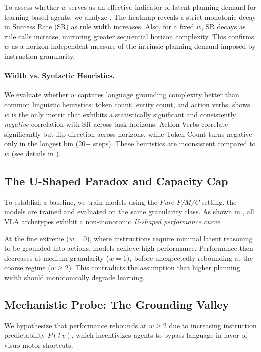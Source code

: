\documentclass[11pt]{article}
\begin{document}
To assess whether $w$ serves as an effective indicator of latent planning demand for learning-based agents, we analyze . The heatmap reveals a strict monotonic decay in Success Rate (SR) as rule width increases. Also, for a fixed $w$, SR decays as rule calls increase, mirroring greater sequential horizon complexity. This confirms $w$ as a horizon-independent measure of the intrinsic planning demand imposed by instruction granularity.

\paragraph{Width vs. Syntactic Heuristics.} 
We evaluate whether $w$ captures language grounding complexity better than common linguistic heuristics: token count, entity count, and action verbs.  shows $w$ is the only metric that exhibits a statistically significant and consistently \emph{negative} correlation with SR across task horizons. Action Verbs correlate significantly but flip direction across horizons, while Token Count turns negative only in the longest bin (20$+$ steps). These heuristics are inconsistent compared to $w$ (see details in ).


\subsection{The U-Shaped Paradox and Capacity Cap}

To establish a baseline, we train models using the \emph{Pure F/M/C} setting. the models are trained and evaluated on the same granularity class. As shown in , all VLA archetypes exhibit a non-monotonic \emph{U-shaped performance curve}. 

At the fine extreme ($w=0$), where instructions require minimal latent reasoning to be grounded into actions, models achieve high performance. Performance then decreases at medium granularity ($w=1$), before unexpectedly rebounding at the coarse regime ($w \ge 2$). This contradicts the assumption that higher planning width should monotonically degrade learning.

\subsection{Mechanistic Probe: The Grounding Valley}
We hypothesize that performance rebounds at $w \ge 2$ due to increasing instruction predictability $P(l|v)$, which incentivizes agents to bypass language in favor of visuo-motor shortcuts.
\end{document}
